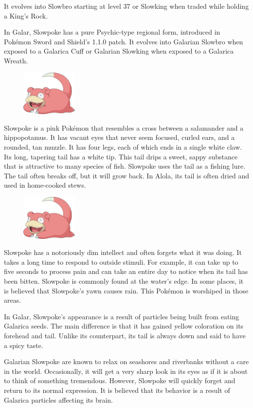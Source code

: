 \documentclass{article}
\begin{document}
It evolves into Slowbro starting at level 37 or Slowking when traded while
holding a King's Rock.

In Galar, Slowpoke has a pure Psychic-type regional form, introduced in Pokémon
Sword and Shield's 1.1.0 patch. It evolves into Galarian Slowbro when exposed to
a Galarica Cuff or Galarian Slowking when exposed to a Galarica Wreath.

\begin{figure} %
  \centering
  \includegraphics[width=0.25\textwidth]{slowpoke.png}
\end{figure}

Slowpoke is a pink Pokémon that resembles a cross between a salamander and a
hippopotamus. It has vacant eyes that never seem focused, curled ears, and a
rounded, tan muzzle. It has four legs, each of which ends in a single white
claw. Its long, tapering tail has a white tip. This tail drips a sweet, sappy
substance that is attractive to many species of fish. Slowpoke uses the tail as
a fishing lure. The tail often breaks off, but it will grow back. In Alola, its
tail is often dried and used in home-cooked stews.

\begin{figure}
  \centering
  \includegraphics[width=0.25\textwidth]{slowpoke.png}
\end{figure}
Slowpoke has a notoriously dim intellect and often forgets what it was doing. It
takes a long time to respond to outside stimuli. For example, it can take up to
five seconds to process pain and can take an entire day to notice when its tail
has been bitten. Slowpoke is commonly found at the water's edge. In some places,
it is believed that Slowpoke's yawn causes rain. This Pokémon is worshiped in
those areas.

In Galar, Slowpoke's appearance is a result of particles being built from eating
Galarica seeds. The main difference is that it has gained yellow coloration on
its forehead and tail. Unlike its counterpart, its tail is always down and said
to have a spicy taste.

Galarian Slowpoke are known to relax on seashores and riverbanks without a care
in the world. Occasionally, it will get a very sharp look in its eyes as if it
is about to think of something tremendous. However, Slowpoke will quickly forget
and return to its normal expression. It is believed that its behavior is a
result of Galarica particles affecting its brain.
\end{document}

